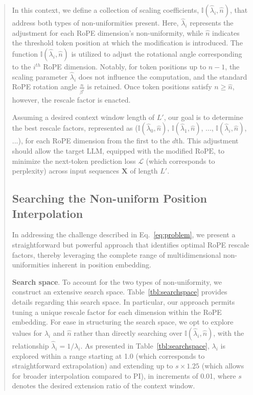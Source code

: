 \begin{abstract}
In this context, we define a collection of scaling coefficients, $\mathbb{I}(\hat{\lambda}_{i},\hat{n})$, that address both types of non-uniformities present. Here, $\hat{\lambda}_{i}$ represents the adjustment for each RoPE dimension’s non-uniformity, while $\hat{n}$ indicates the threshold token position at which the modification is introduced. The function $\mathbb{I}(\hat{\lambda}_{i},\hat{n})$ is utilized to adjust the rotational angle corresponding to the $i^{th}$ RoPE dimension. Notably, for token positions up to $\hat{n}-1$, the scaling parameter $\hat\lambda_{i}$ does not influence the computation, and the standard RoPE rotation angle $\frac{n}{\beta^i}$ is retained. Once token positions satisfy $n\ge\hat{n}$, however, the rescale factor is enacted.

Assuming a desired context window length of $L'$, our goal is to determine the best rescale factors, represented as ($\mathbb{I}(\hat{\lambda}_{0},\hat{n})$, $\mathbb{I}(\hat{\lambda}_{1},\hat{n})$, ..., $\mathbb{I}(\hat{\lambda}_{i},\hat{n})$, ...), for each RoPE dimension from the first to the $d$th. This adjustment should allow the target $\text{LLM}$, equipped with the modified $\text{RoPE}$, to minimize the next-token prediction loss $\mathcal{L}$ (which corresponds to perplexity) across input sequences $\mathbf{X}$ of length $L'$.

\subsection{Searching the Non-uniform Position Interpolation}

In addressing the challenge described in Eq.~\ref{eq:problem}, we present a straightforward but powerful approach that identifies optimal RoPE rescale factors, thereby leveraging the complete range of multidimensional non-uniformities inherent in position embedding.

\textbf{Search space}. To account for the two types of non-uniformity, we construct an extensive search space. Table~\ref{tbl:searchspace} provides details regarding this search space. In particular, our approach permits tuning a unique rescale factor for each dimension within the RoPE embedding. For ease in structuring the search space, we opt to explore values for $\lambda_i$ and $\hat{n}$ rather than directly searching over $\mathbb{I}(\hat{\lambda}_{i},\hat{n})$, with the relationship $\hat{\lambda}_{i}=1/\lambda_i$. As presented in Table~\ref{tbl:searchspace}, $\lambda_i$ is explored within a range starting at 1.0 (which corresponds to straightforward extrapolation) and extending up to $s\times1.25$ (which allows for broader interpolation compared to PI), in increments of 0.01, where $s$ denotes the desired extension ratio of the context window.


\end{abstract}

